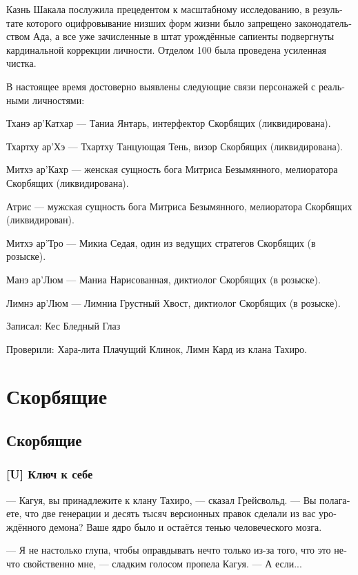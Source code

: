 \documentclass[a4paper,12pt,fleqn]{book}\usepackage{polyglossia}\setdefaultlanguage[babelshorthands=true]{russian}\setotherlanguage{english}\defaultfontfeatures{Ligatures=TeX,Mapping=tex-text}\usepackage{xcolor}\newcommand{\ml}[3]{#2}
\newcommand{\textspace}{\vspace{1em}{\centering\Large\bfseries<...>\par}\vspace{1em}}
\begin{document}
Казнь Шакала послужила прецедентом к масштабному исследованию, в результате которого оцифровывание низших форм жизни было запрещено законодательством Ада, а все уже зачисленные в штат урождённые сапиенты подвергнуты кардинальной коррекции личности.
Отделом 100 была проведена усиленная чистка.

В настоящее время достоверно выявлены следующие связи персонажей с реальными личностями:

Тханэ ар'Катхар --- Таниа Янтарь, интерфектор Скорбящих (ликвидирована).

Тхартху ар'Хэ --- Тхартху Танцующая Тень, визор Скорбящих (ликвидирована).

Митхэ ар'Кахр --- женская сущность бога Митриса Безымянного, мелиоратора Скорбящих (ликвидирована).

Атрис --- мужская сущность бога Митриса Безымянного, мелиоратора Скорбящих (ликвидирован).

Митхэ ар'Тро --- Микиа Седая, один из ведущих стратегов Скорбящих (в розыске).

Манэ ар'Люм --- Маниа Нарисованная, диктиолог Скорбящих (в розыске).

Лимнэ ар'Люм --- Лимниа Грустный Хвост, диктиолог Скорбящих (в розыске).

Записал: Кес Бледный Глаз

Проверили: Хара-лита Плачущий Клинок, Лимн Кард из клана Тахиро.

\part{Скорбящие}

\chapter{Скорбящие}

\section{[U] Ключ к себе}

\textspace

--- Кагуя, вы принадлежите к клану Тахиро, --- сказал Грейсвольд.
--- Вы полагаете, что две генерации и десять тысяч версионных правок сделали из вас урождённого демона?
Ваше ядро было и остаётся тенью человеческого мозга.

--- Я не настолько глупа, чтобы оправдывать нечто только из-за того, что это нечто свойственно мне, --- сладким голосом пропела Кагуя.
--- А если...
\end{document}
